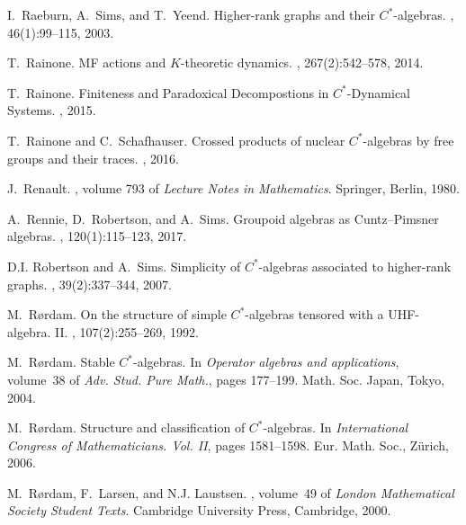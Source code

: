 \documentclass[a4paper, 12pt]{amsart}
\numberwithin{equation}{section}
\theoremstyle{remark}
\theoremstyle{definition}
\begin{document}
\begin{thebibliography}{10}
 I.~Raeburn, A.~Sims, and T.~Yeend.
\newblock Higher-rank graphs and their {$C^*$}-algebras.
, 46(1):99--115, 2003.

 T.~Rainone.
\newblock M{F} actions and {$K$}-theoretic dynamics.
, 267(2):542--578, 2014.

 T.~Rainone.
\newblock Finiteness and {P}aradoxical {D}ecompostions in {$C^*$}-{D}ynamical
  {S}ystems.
,
  2015.

 T.~Rainone and C.~Schafhauser.
\newblock Crossed products of nuclear {$C^*$}-algebras by free groups and their
  traces.
,
  2016.

 J.~Renault.
, volume 793 of
  {\em Lecture Notes in Mathematics}.
\newblock Springer, Berlin, 1980.

 A.~Rennie, D.~Robertson, and A.~Sims.
\newblock Groupoid algebras as {C}untz--{P}imsner algebras.
, 120(1):115--123, 2017.

 D.I. Robertson and A.~Sims.
\newblock Simplicity of {$C^*$}-algebras associated to higher-rank graphs.
, 39(2):337--344, 2007.

 M.~R{\o}rdam.
\newblock On the structure of simple {$C^*$}-algebras tensored with a
  {UHF}-algebra. {II}.
, 107(2):255--269, 1992.

 M.~R{\o}rdam.
\newblock Stable {$C^*$}-algebras.
\newblock In {\em Operator algebras and applications}, volume~38 of {\em Adv.
  Stud. Pure Math.}, pages 177--199. Math. Soc. Japan, Tokyo, 2004.

 M.~R{\o}rdam.
\newblock Structure and classification of {$C^*$}-algebras.
\newblock In {\em International {C}ongress of {M}athematicians. {V}ol. {II}},
  pages 1581--1598. Eur. Math. Soc., Z\"urich, 2006.

 M.~R{\o}rdam, F.~Larsen, and N.J. Laustsen.
, volume~49
  of {\em London Mathematical Society Student Texts}.
\newblock Cambridge University Press, Cambridge, 2000.


\end{thebibliography}
\end{document}
